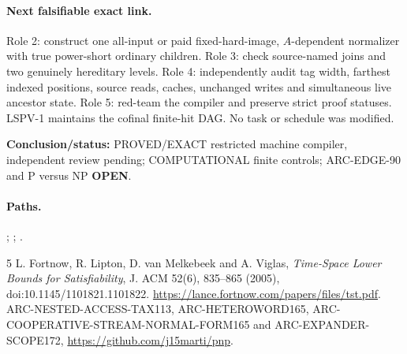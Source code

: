 \documentclass[11pt]{article}
\begin{document}
\paragraph{Next falsifiable exact link.}
Role 2: construct one all-input or paid fixed-hard-image, $A$-dependent normalizer with true power-short ordinary children. Role 3: check source-named joins and two genuinely hereditary levels. Role 4: independently audit tag width, farthest indexed positions, source reads, caches, unchanged writes and simultaneous live ancestor state. Role 5: red-team the compiler and preserve strict proof statuses. LSPV-1 maintains the cofinal finite-hit DAG. No task or schedule was modified.

\textbf{Conclusion/status:} PROVED/EXACT restricted machine compiler, independent review pending; COMPUTATIONAL finite controls; ARC-EDGE-90 and P versus NP \textbf{OPEN}.

\paragraph{Paths.}
;
;
.

\begin{thebibliography}{5}
 L. Fortnow, R. Lipton, D. van Melkebeek and A. Viglas, \emph{Time-Space Lower Bounds for Satisfiability}, J. ACM 52(6), 835--865 (2005), doi:10.1145/1101821.1101822. \url{https://lance.fortnow.com/papers/files/tst.pdf}.
 ARC-NESTED-ACCESS-TAX113, ARC-HETEROWORD165, ARC-COOPERATIVE-STREAM-NORMAL-FORM165 and ARC-EXPANDER-SCOPE172, \url{https://github.com/j15marti/pnp}.
\end{thebibliography}
\end{document}
